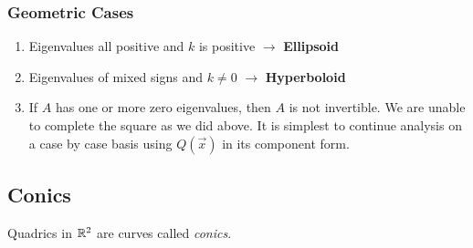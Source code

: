 \documentclass[../main.tex]{subfiles}
\begin{document}
\subsubsection{Geometric Cases}
\begin{enumerate}
  \item Eigenvalues all positive and $k$ is positive $\to$ \textbf{Ellipsoid}
  \item Eigenvalues of mixed signs and $k \neq 0$ $\to$ \textbf{Hyperboloid}
  \item If $A$ has one or more zero eigenvalues, then $A$ is not invertible.
    We are unable to complete the square as we did above.
    It is simplest to continue analysis on a case by case basis using $Q(\vec{x})$ in its component form.
\end{enumerate}
\subsection{Conics}
Quadrics in $\mathbb{R}^2$ are curves called \textit{conics}.
\end{document}
